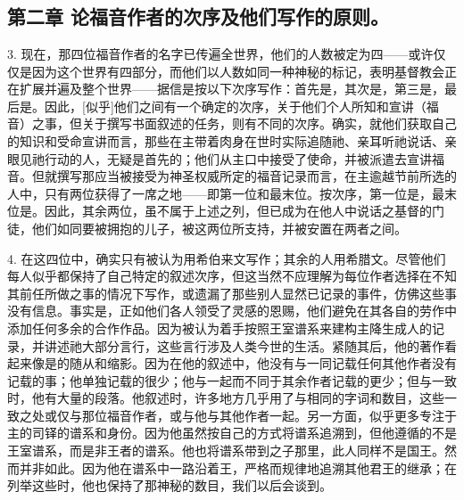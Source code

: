 
\section{}


\subsection{第二章  论福音作者的次序及他们写作的原则。}

3.  现在，那四位福音作者的名字已传遍全世界，他们的人数被定为四——或许仅仅是因为这个世界有四部分，而他们以人数如同一种神秘的标记，表明基督教会正在扩展并遍及整个世界——据信是按以下次序写作：首先是，其次是，第三是，最后是。因此，[似乎]他们之间有一个确定的次序，关于他们个人所知和宣讲（福音）之事，但关于撰写书面叙述的任务，则有不同的次序。确实，就他们获取自己的知识和受命宣讲而言，那些在主带着肉身在世时实际追随祂、亲耳听祂说话、亲眼见祂行动的人，无疑是首先的；他们从主口中接受了使命，并被派遣去宣讲福音。但就撰写那应当被接受为神圣权威所定的福音记录而言，在主逾越节前所选的人中，只有两位获得了一席之地——即第一位和最末位。按次序，第一位是，最末位是。因此，其余两位，虽不属于上述之列，但已成为在他人中说话之基督的门徒，他们如同要被拥抱的儿子，被这两位所支持，并被安置在两者之间。\par

4.  在这四位中，确实只有被认为用希伯来文写作；其余的人用希腊文。尽管他们每人似乎都保持了自己特定的叙述次序，但这当然不应理解为每位作者选择在不知其前任所做之事的情况下写作，或遗漏了那些别人显然已记录的事件，仿佛这些事没有信息。事实是，正如他们各人领受了灵感的恩赐，他们避免在其各自的劳作中添加任何多余的合作作品。因为被认为着手按照王室谱系来建构主降生成人的记录，并讲述祂大部分言行，这些言行涉及人类今世的生活。紧随其后，他的著作看起来像是的随从和缩影。因为在他的叙述中，他没有与一同记载任何其他作者没有记载的事；他单独记载的很少；他与一起而不同于其余作者记载的更少；但与一致时，他有大量的段落。他叙述时，许多地方几乎用了与相同的字词和数目，这些一致之处或仅与那位福音作者，或与他与其他作者一起。另一方面，似乎更多专注于主的司铎的谱系和身份。因为他虽然按自己的方式将谱系追溯到，但他遵循的不是王室谱系，而是非王者的谱系。他也将谱系带到之子那里，此人同样不是国王。然而并非如此。因为他在谱系中一路沿着王，严格而规律地追溯其他君王的继承；在列举这些时，他也保持了那神秘的数目，我们以后会谈到。\par

